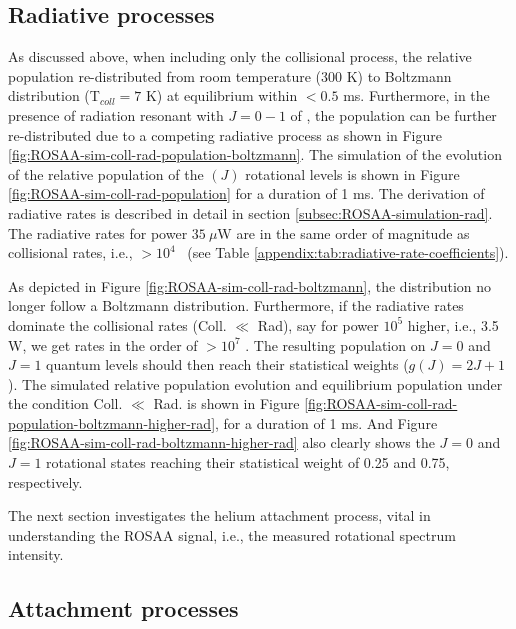 \subsection{Radiative processes}
\label{subsec:CD+-kinetics-simulation-coll-rad}

As discussed above, when including only the collisional process, the relative
population re-distributed from room temperature (300 K) to Boltzmann
distribution (T$_{coll}=7$ K) at equilibrium within $<0.5$ ms. Furthermore, in
the presence of radiation resonant with $J=0-1$ of \CD, the population can be
further re-distributed due to a competing radiative process as shown in Figure
\ref{fig:ROSAA-sim-coll-rad-population-boltzmann}. The simulation of the
evolution of the relative population of the \CD$(J)$ rotational levels is shown
in Figure \ref{fig:ROSAA-sim-coll-rad-population} for a duration of 1 ms. The
derivation of radiative rates is described in detail in section
\ref{subsec:ROSAA-simulation-rad}. The radiative rates for power $35\ \mu$W are
in the same order of magnitude as collisional rates, i.e., $>10^{4}$ \pers\
(see Table \ref{appendix:tab:radiative-rate-coefficients}).



As depicted in Figure \ref{fig:ROSAA-sim-coll-rad-boltzmann}, the distribution
no longer follow a Boltzmann distribution. Furthermore, if the radiative rates
dominate the collisional rates (Coll. $\ll$ Rad), say for power $10^{5}$
higher, i.e., 3.5 W, we get rates in the order of $>10^{7}$ \pers. The
resulting population on $J=0$ and $J=1$ quantum levels should then reach their
statistical weights ($g(J) = 2J + 1$). The simulated relative population
evolution and equilibrium population under the condition Coll. $\ll$ Rad. is
shown in Figure \ref{fig:ROSAA-sim-coll-rad-population-boltzmann-higher-rad},
for a duration of 1 ms. And Figure
\ref{fig:ROSAA-sim-coll-rad-boltzmann-higher-rad} also clearly shows the $J=0$
and $J=1$ rotational states reaching their statistical weight of 0.25 and 0.75,
respectively.



The next section investigates the helium attachment process, vital in
understanding the ROSAA signal, i.e., the measured rotational spectrum
intensity.

\subsection{Attachment processes}
\label{subsec:CD+-kinetics-simulation-coll-rad-att}

